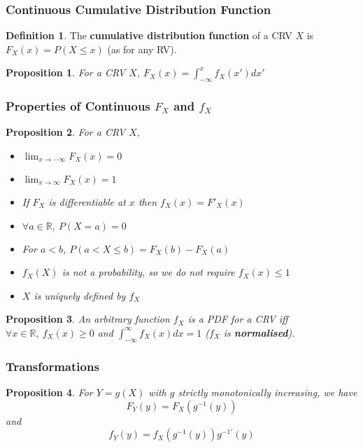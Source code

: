 \documentclass[12pt]{article}
\newtheorem*{prop*}{Proposition}
\theoremstyle{definition}
\newtheorem{defn}{Definition}[subsection]
\newcommand{\R}{\mathbb{R}}
\begin{document}
\subsubsection{Continuous Cumulative Distribution Function}

\begin{defn}
  The \textbf{cumulative distribution function} of a CRV $X$ is $F_X(x) = P(X \leq x)$ (as for any RV).
\end{defn}

\begin{prop*}
  For a CRV $X$, $F_X(x) = \int_{-\infty}^xf_X(x')dx'$
\end{prop*}

\subsubsection{Properties of Continuous $F_X$ and $f_X$}

\begin{prop*}
  For a CRV $X$,
  \begin{itemize}
    \item $\lim_{x \to -\infty}F_X(x) = 0$
    \item $\lim_{x \to \infty}F_X(x) = 1$
    \item If $F_X$ is differentiable at $x$ then $f_X(x) = F'_X(x)$
    \item $\forall a \in \R,\ P(X = a) = 0$
    \item For $a < b$, $P(a < X \leq b) = F_X(b) - F_X(a)$
    \item $f_X(X)$ is not a probability, so we do not require $f_X(x) \leq 1$
    \item $X$ is uniquely defined by $f_X$
  \end{itemize}
\end{prop*}

\begin{prop*}
  An arbitrary function $f_X$ is a PDF for a CRV iff $\forall x \in \R,\ f_X(x) \geq 0$ and $\int_{-\infty}^{\infty}f_X(x)dx = 1$ ($f_X$ is \textbf{normalised}).
\end{prop*}

\subsubsection{Transformations}

\begin{prop*}
  For $Y = g(X)$ with $g$ strictly monotonically increasing, we have
  $$F_Y(y) = F_X(g^{-1}(y))$$
  and
  $$f_Y(y) = f_X\left(g^{-1}(y)\right)g^{-1'}(y)$$
\end{prop*}
\end{document}
